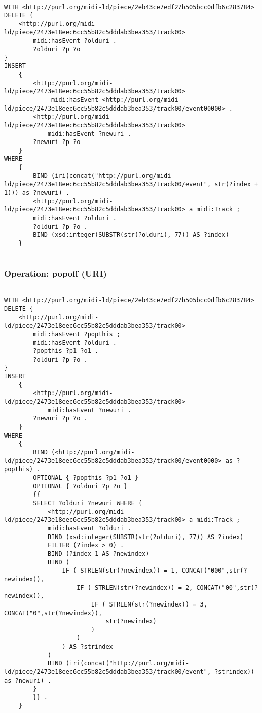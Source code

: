 \begin{lstlisting}[language=sparql]

WITH <http://purl.org/midi-ld/piece/2eb43ce7edf27b505bcc0dfb6c283784>
DELETE {
	<http://purl.org/midi-ld/piece/2473e18eec6cc55b82c5dddab3bea353/track00> 
		midi:hasEvent ?olduri .
		?olduri ?p ?o
}
INSERT
	{ 
		<http://purl.org/midi-ld/piece/2473e18eec6cc55b82c5dddab3bea353/track00>
			 midi:hasEvent <http://purl.org/midi-ld/piece/2473e18eec6cc55b82c5dddab3bea353/track00/event00000> .
		<http://purl.org/midi-ld/piece/2473e18eec6cc55b82c5dddab3bea353/track00> 
			midi:hasEvent ?newuri .
		?newuri ?p ?o
	}
WHERE 
	{  
		BIND (iri(concat("http://purl.org/midi-ld/piece/2473e18eec6cc55b82c5dddab3bea353/track00/event", str(?index + 1))) as ?newuri) .
		<http://purl.org/midi-ld/piece/2473e18eec6cc55b82c5dddab3bea353/track00> a midi:Track ;
		midi:hasEvent ?olduri .
		?olduri ?p ?o .
		BIND (xsd:integer(SUBSTR(str(?olduri), 77)) AS ?index)
	}


\end{lstlisting}

\subsubsection{Operation: popoff (URI)}
\label{query:URI:popoff}

\begin{lstlisting}[language=sparql]

WITH <http://purl.org/midi-ld/piece/2eb43ce7edf27b505bcc0dfb6c283784>
DELETE {
	<http://purl.org/midi-ld/piece/2473e18eec6cc55b82c5dddab3bea353/track00> 
		midi:hasEvent ?popthis ;
		midi:hasEvent ?olduri .
		?popthis ?p1 ?o1 .
		?olduri ?p ?o .
}
INSERT
	{ 
		<http://purl.org/midi-ld/piece/2473e18eec6cc55b82c5dddab3bea353/track00> 
			midi:hasEvent ?newuri .
		?newuri ?p ?o .
	}
WHERE 
	{ 
		BIND (<http://purl.org/midi-ld/piece/2473e18eec6cc55b82c5dddab3bea353/track00/event0000> as ?popthis) .
		OPTIONAL { ?popthis ?p1 ?o1 }
		OPTIONAL { ?olduri ?p ?o }
		{{
		SELECT ?olduri ?newuri WHERE {
			<http://purl.org/midi-ld/piece/2473e18eec6cc55b82c5dddab3bea353/track00> a midi:Track ;
			midi:hasEvent ?olduri .
			BIND (xsd:integer(SUBSTR(str(?olduri), 77)) AS ?index)
			FILTER (?index > 0) .
			BIND (?index-1 AS ?newindex)
			BIND (
				IF ( STRLEN(str(?newindex)) = 1, CONCAT("000",str(?newindex)), 
					IF ( STRLEN(str(?newindex)) = 2, CONCAT("00",str(?newindex)), 
						IF ( STRLEN(str(?newindex)) = 3, CONCAT("0",str(?newindex)), 
							str(?newindex)
						)
					)
				) AS ?strindex
			)
			BIND (iri(concat("http://purl.org/midi-ld/piece/2473e18eec6cc55b82c5dddab3bea353/track00/event", ?strindex)) as ?newuri) .
		}	
		}} .
	}


\end{lstlisting}

